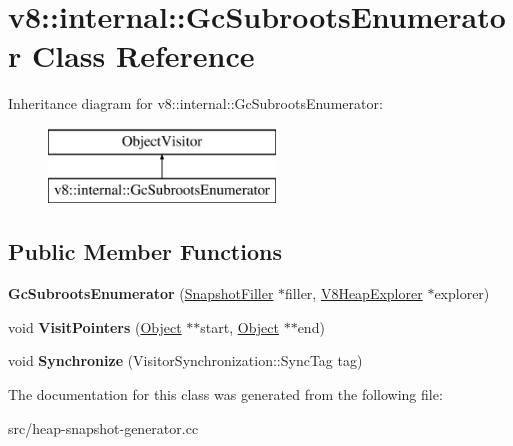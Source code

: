 \hypertarget{classv8_1_1internal_1_1_gc_subroots_enumerator}{}\section{v8\+:\+:internal\+:\+:Gc\+Subroots\+Enumerator Class Reference}
\label{classv8_1_1internal_1_1_gc_subroots_enumerator}
Inheritance diagram for v8\+:\+:internal\+:\+:Gc\+Subroots\+Enumerator\+:\begin{figure}[H]
\begin{center}
\leavevmode
\includegraphics[height=2.000000cm]{classv8_1_1internal_1_1_gc_subroots_enumerator}
\end{center}
\end{figure}
\subsection*{Public Member Functions}
\begin{DoxyCompactItemize}
\item 
\hypertarget{classv8_1_1internal_1_1_gc_subroots_enumerator_ac3066b5f31f0a60bf9fc475a54e70a7d}{}{\bfseries Gc\+Subroots\+Enumerator} (\hyperlink{classv8_1_1internal_1_1_snapshot_filler}{Snapshot\+Filler} $\ast$filler, \hyperlink{classv8_1_1internal_1_1_v8_heap_explorer}{V8\+Heap\+Explorer} $\ast$explorer)\label{classv8_1_1internal_1_1_gc_subroots_enumerator_ac3066b5f31f0a60bf9fc475a54e70a7d}

\item 
\hypertarget{classv8_1_1internal_1_1_gc_subroots_enumerator_a76e6292c58906bd61604b7726247e800}{}void {\bfseries Visit\+Pointers} (\hyperlink{classv8_1_1internal_1_1_object}{Object} $\ast$$\ast$start, \hyperlink{classv8_1_1internal_1_1_object}{Object} $\ast$$\ast$end)\label{classv8_1_1internal_1_1_gc_subroots_enumerator_a76e6292c58906bd61604b7726247e800}

\item 
\hypertarget{classv8_1_1internal_1_1_gc_subroots_enumerator_ac325a9d8300929323dd9338fa35d390b}{}void {\bfseries Synchronize} (Visitor\+Synchronization\+::\+Sync\+Tag tag)\label{classv8_1_1internal_1_1_gc_subroots_enumerator_ac325a9d8300929323dd9338fa35d390b}

\end{DoxyCompactItemize}


The documentation for this class was generated from the following file\+:\begin{DoxyCompactItemize}
\item 
src/heap-\/snapshot-\/generator.\+cc\end{DoxyCompactItemize}
